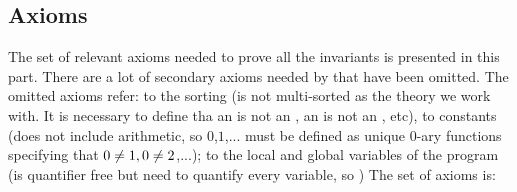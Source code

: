 \subsection{Axioms}

The set of relevant axioms needed to prove all the invariants is presented in this part.
%
There are a lot of secondary axioms needed by \spass that have been omitted. 
%
The omitted axioms refer: 
%
to the sorting (\spass is not multi-sorted as the theory we work with. It is necessary to define tha an \addr is not an \elem, an \elem is not an \addr, etc), to constants (\spass does not include arithmetic, so $0$,$1$,... must be defined as unique 0-ary functions specifying that $0\not= 1,0\not= 2$,...); 
%
to the local and global variables of the program (\leap is quantifier free but \spass need to quantify every variable, so )
%
The set of axioms is:
		
\begin{description}
\label{ax::fulllist}

\end{description}

